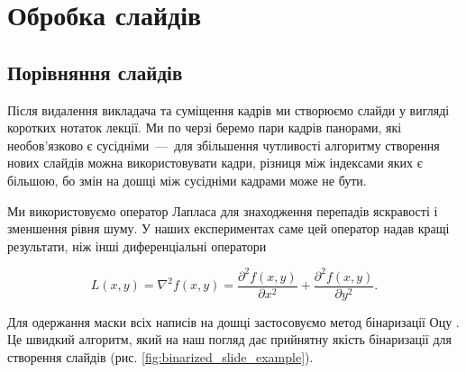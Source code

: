 \section{Обробка слайдів}
\vspace{-\baselineskip}
\subsection{Порівняння слайдів}

Після видалення викладача та суміщення кадрів ми створюємо слайди у вигляді
коротких нотаток лекції. Ми по черзі беремо пари кадрів панорами, які
необов'язково є сусідніми~---~для збільшення чутливості алгоритму створення нових
слайдів можна використовувати кадри, різниця між індексами яких є більшою, бо
змін на дошці між сусідніми кадрами може не бути.

Ми використовуємо оператор Лапласа \cite{website:scikit-image} для знаходження перепадів
яскравості і зменшення рівня шуму. У наших експериментах саме цей
оператор надав кращі результати, ніж інші диференціальні оператори

\begin{equation*}
  L(x,y) = \nabla^{2}f(x,y) = \frac{\partial^{2}f(x,y)}{\partial x^{2}} + \frac{\partial^{2}f(x,y)}{\partial y^{2}}.
\end{equation*}

Для одержання маски всіх написів на дошці застосовуємо метод бінаризації
Оцу \cite{website:scikit-image}. Це швидкий алгоритм, який на наш погляд дає прийнятну
якість бінаризації для створення слайдів (рис. \ref{fig:binarized_slide_example}).


